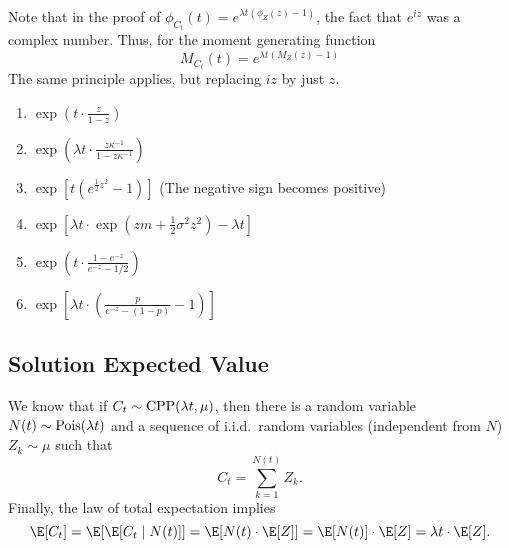 Note that in the proof of $\phi_{C_t}(t) = e^{\lambda t(\phi_Z(z) - 1)}$, the fact that $e^{iz}$ was a complex number. Thus, for the moment generating function
\[ M_{C_t}(t) = e^{\lambda t(M_Z(z) - 1)} \]
The same principle applies, but replacing $iz$ by just $z$.
\begin{enumerate}[label=(\alph*)]
    \item $ \exp\left( t\cdot\frac{ z}{1- z} \right) $
    \item $ \exp\left(\lambda t\cdot\frac{ z\kappa^{-1}}{1- z\kappa^{-1}} \right)$
    \item $ \exp\left[ t (e^{\frac{1}{2} z^2} - 1) \right] $ (The negative sign becomes positive)
    \item $ \exp\left[ \lambda t \cdot \exp \left( zm + \frac{1}{2}\sigma^2 z^2 \right) - \lambda t \right] $
    \item $ \exp\left( t\cdot  \frac{1-e^{-z}}{e^{-z}-1/2} \right) $
    \item $ \exp\left[ \lambda t\cdot \left( \frac{p}{e^{-z}-(1-p)} - 1  \right) \right] $
\end{enumerate}


\subsection*{Solution Expected Value}

We know that if $C_t \sim \hbox{CPP}(\lambda t, \mu)$, then there is a random variable $N(t) \sim \hbox{Pois}(\lambda t)$ and a sequence of i.i.d.\ random variables (independent from $N$) $Z_k \sim \mu$ such that
\[ C_t = \sum_{k = 1}^{N(t)}Z_k. \]
Finally, the law of total expectation implies
\[ \E[C_t] = \E [ \E[C_t\;|\; N(t)] ] = \E [N(t) \cdot \E[Z]] = \E[N(t)] \cdot \E[Z] = \lambda t \cdot \E[Z]. \]

